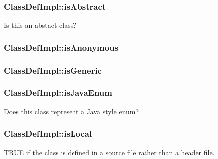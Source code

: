 \subsubsection[{is\+Abstract}]{ Class\+Def\+Impl\+::is\+Abstract}\label{class_class_def_impl_add7ec887a9774fff23c51033b0f68cd1}
Is this an abstact class? \hypertarget{class_class_def_impl_a65e6446458cf26ce8e39a55a5c111195}{}
\subsubsection[{is\+Anonymous}]{ Class\+Def\+Impl\+::is\+Anonymous}\label{class_class_def_impl_a65e6446458cf26ce8e39a55a5c111195}
\hypertarget{class_class_def_impl_ad8a4566782b5669e5a77978189900f75}{}
\subsubsection[{is\+Generic}]{ Class\+Def\+Impl\+::is\+Generic}\label{class_class_def_impl_ad8a4566782b5669e5a77978189900f75}
\hypertarget{class_class_def_impl_a435f18aa29bf28b0723ea7c7fd79b825}{}
\subsubsection[{is\+Java\+Enum}]{ Class\+Def\+Impl\+::is\+Java\+Enum}\label{class_class_def_impl_a435f18aa29bf28b0723ea7c7fd79b825}
Does this class represent a Java style enum? \hypertarget{class_class_def_impl_a9a751bb93d4da92aceace3210c911aa1}{}
\subsubsection[{is\+Local}]{ Class\+Def\+Impl\+::is\+Local}\label{class_class_def_impl_a9a751bb93d4da92aceace3210c911aa1}
T\+R\+U\+E if the class is defined in a source file rather than a header file. \hypertarget{class_class_def_impl_a066ef909e009befddbd31341b9ddbb5b}{}
